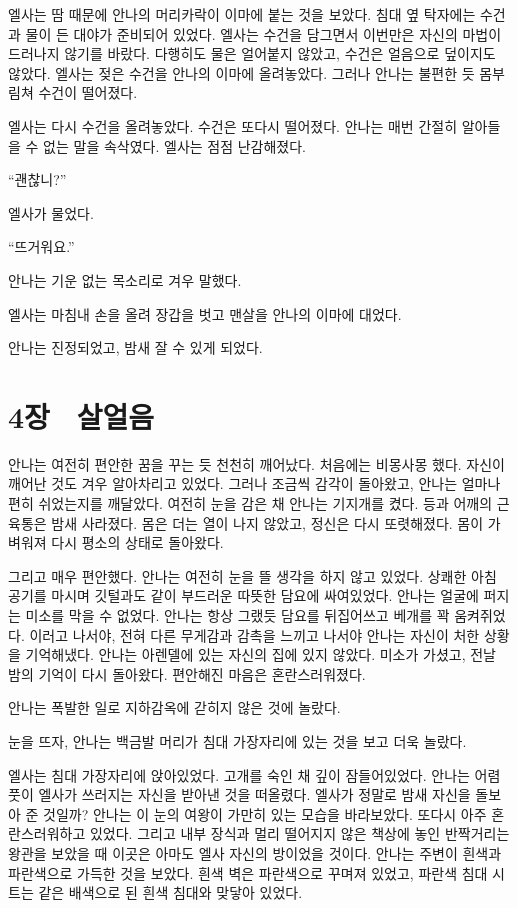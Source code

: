엘사는 땀 때문에 안나의 머리카락이 이마에 붙는 것을 보았다. 침대 옆 탁자에는 수건과 물이 든 대야가 준비되어 있었다. 엘사는 수건을 담그면서 이번만은 자신의 마법이 드러나지 않기를 바랐다. 다행히도 물은 얼어붙지 않았고, 수건은 얼음으로 덮이지도 않았다. 엘사는 젖은 수건을 안나의 이마에 올려놓았다. 그러나 안나는 불편한 듯 몸부림쳐 수건이 떨어졌다.

엘사는 다시 수건을 올려놓았다. 수건은 또다시 떨어졌다. 안나는 매번 간절히 알아들을 수 없는 말을 속삭였다. 엘사는 점점 난감해졌다.

``괜찮니?''

엘사가 물었다.

``뜨거워요.''

안나는 기운 없는 목소리로 겨우 말했다.

엘사는 마침내 손을 올려 장갑을 벗고 맨살을 안나의 이마에 대었다.

안나는 진정되었고, 밤새 잘 수 있게 되었다.



\chapter[4장  살얼음][4장\hspace*{.5em}살얼음]{4장 \ 살얼음}



안나는 여전히 편안한 꿈을 꾸는 듯 천천히 깨어났다. 처음에는 비몽사몽 했다. 자신이 깨어난 것도 겨우 알아차리고 있었다. 그러나 조금씩 감각이 돌아왔고, 안나는 얼마나 편히 쉬었는지를 깨달았다. 여전히 눈을 감은 채 안나는 기지개를 켰다. 등과 어깨의 근육통은 밤새 사라졌다. 몸은 더는 열이 나지 않았고, 정신은 다시 또렷해졌다. 몸이 가벼워져 다시 평소의 상태로 돌아왔다.

그리고 매우 편안했다. 안나는 여전히 눈을 뜰 생각을 하지 않고 있었다. 상쾌한 아침 공기를 마시며 깃털과도 같이 부드러운 따뜻한 담요에 싸여있었다. 안나는 얼굴에 퍼지는 미소를 막을 수 없었다. 안나는 항상 그랬듯 담요를 뒤집어쓰고 베개를 꽉 움켜쥐었다. 이러고 나서야, 전혀 다른 무게감과 감촉을 느끼고 나서야 안나는 자신이 처한 상황을 기억해냈다. 안나는 아렌델에 있는 자신의 집에 있지 않았다. 미소가 가셨고, 전날 밤의 기억이 다시 돌아왔다. 편안해진 마음은 혼란스러워졌다.

안나는 폭발한 일로 지하감옥에 갇히지 않은 것에 놀랐다.

눈을 뜨자, 안나는 백금발 머리가 침대 가장자리에 있는 것을 보고 더욱 놀랐다.

엘사는 침대 가장자리에 앉아있었다. 고개를 숙인 채 깊이 잠들어있었다. 안나는 어렴풋이 엘사가 쓰러지는 자신을 받아낸 것을 떠올렸다. 엘사가 정말로 밤새 자신을 돌보아 준 것일까? 안나는 이 눈의 여왕이 가만히 있는 모습을 바라보았다. 또다시 아주 혼란스러워하고 있었다. 그리고 내부 장식과 멀리 떨어지지 않은 책상에 놓인 반짝거리는 왕관을 보았을 때 이곳은 아마도 엘사 자신의 방이었을 것이다. 안나는 주변이 흰색과 파란색으로 가득한 것을 보았다. 흰색 벽은 파란색으로 꾸며져 있었고, 파란색 침대 시트는 같은 배색으로 된 흰색 침대와 맞닿아 있었다.

